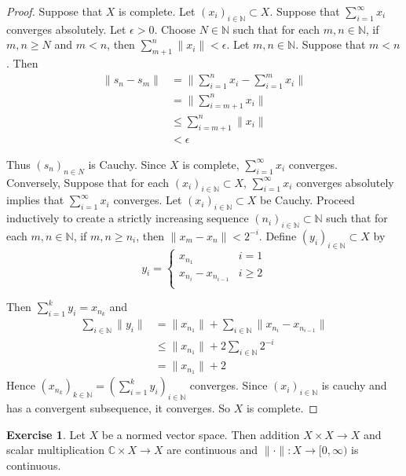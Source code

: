 \documentclass[12pt]{amsart}
\theoremstyle{definition}
\newtheorem{ex}[definition]{Exercise}
\newcommand{\ep}{\epsilon}
\newcommand{\C}{\mathbb{C}}
\newcommand{\N}{\mathbb{N}}
\newcommand{\Rg}{[0,\infty)}
\newcommand{\seq}[2]{(#1_{#2})_{#2 \in \N}}
\DeclareMathOperator*{\0}{\mbf{0}}
\DeclareMathOperator*{\1}{\mbf{1}}
\newcommand{\lex}[1]{\label{ex:#1}}
\begin{document}
	\begin{proof}
		Suppose that $X$ is complete. Let $\seq{x}{i} \subset X$. Suppose that $\sum_{i=1}^{\infty}x_i$ converges absolutely. Let $\ep >0$. Choose $N \in \N$ such that for each $m,n \in \N$, if $m, n \geq N$ and $m< n$, then $\sum_{m+1}^n \|x_i \|< \ep$. Let $m, n \in \N$. Suppose that $m<n$. Then 
		\begin{align*}
			\|s_n-s_m \|
			&= \bigg \|\sum_{i=1}^n x_i -\sum_{i=1}^m x_i\bigg \|\\
			&= \bigg\|\sum_{i=m+1}^{n} x_i \bigg \| \\
			& \leq \sum_{i=m+1}^n \|x_i \|\\
			& < \ep
		\end{align*}
		
		Thus $(s_n)_{n \in N}$ is Cauchy. Since $X$ is complete, $\sum_{i=1}^{\infty}x_i$ converges. \\
		Conversely, Suppose that for each $\seq{x}{i} \subset X$, $\sum_{i =1}^{\infty}x_i$ converges absolutely implies that $\sum_{i=1}^{\infty}x_i$ converges. Let $\seq{x}{i} \subset X$ be Cauchy. Proceed inductively to create a strictly increasing sequence $(n_i)_{i \in \N} \subset \N$ such that for each $m, n \in \N$, if $m,n \geq n_i$, then $ \|x_m-x_n \|< 2^{-i}$. Define $(y_i)_{i \in \N} \subset X$ by 
		\[ y_i = \begin{cases}
			x_{n_1} & i=1 \\
			x_{n_i} - x_{n_{i-1}} & i \geq 2\\
		\end{cases}\]
		
		Then $\sum_{i=1}^k y_i = x_{n_k}$ and 
		\begin{align*}
			\sum_{i \in \N} \|y_i \|
			&= \|x_{n_1} \|+ \sum_{i \in \N} \|x_{n_i}-x_{n_{i-1}} \|\\
			& \leq \|x_{n_1} \|+ 2\sum_{i \in \N}2^{-i}\\
			& = \|x_{n_1} \|+2
		\end{align*}
		Hence $(x_{n_k})_{k \in \N} = (\sum_{i=1}^k y_i)_{i\in \N}$ converges. Since $(x_i)_{i \in \N}$ is cauchy and has a convergent subsequence, it converges. So $X$ is complete.
	\end{proof}
	
	\begin{ex} \lex{}
		Let $X$ be a normed vector space. Then addition $X \times X \rightarrow X$ and scalar multiplication $\C \times X \rightarrow X$ are continuous and $\|\cdot \|:X \rightarrow \Rg$ is continuous.
	\end{ex}
	
\end{document}
